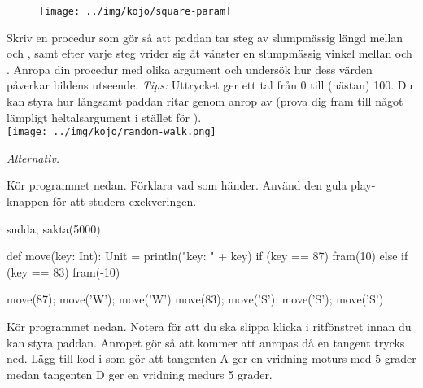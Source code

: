 \begin{figure}[H]
\texttt{[image: ../img/kojo/square-param]}
\end{figure}


\Subtask Skriv en procedur  som gör så att paddan tar  steg av slumpmässig längd mellan  och , samt efter varje steg vrider sig åt vänster en slumpmässig vinkel mellan  och . Anropa din procedur med olika argument och undersök hur dess värden påverkar bildens utseende. \emph{Tips:} Uttrycket  ger ett tal från 0 till (nästan) 100. Du kan styra hur långsamt paddan ritar genom anrop av  (prova dig fram till något  lämpligt heltalsargument i stället för ).
\vspace{2em}\\\texttt{[image: ../img/kojo/random-walk.png]}













\Task \emph{Alternativ.} \label{kojo:alt}

\Subtask Kör programmet nedan. Förklara vad som händer. Använd den gula play-knappen för att studera exekveringen.

\begin{Code}
sudda; sakta(5000)

def move(key: Int): Unit = {
  println("key: " + key)
  if (key == 87) fram(10)
  else if (key == 83) fram(-10)
}

move(87); move('W'); move('W')
move(83); move('S'); move('S'); move('S')
\end{Code}

\Subtask \label{subtask:keypress}  Kör programmet nedan. Notera  för att du ska slippa klicka i ritfönstret innan du kan styra paddan. Anropet  gör så att  kommer att anropas då en tangent trycks ned. Lägg till kod i  som gör att tangenten A ger en vridning moturs med 5 grader medan tangenten D ger en vridning medurs 5 grader.

